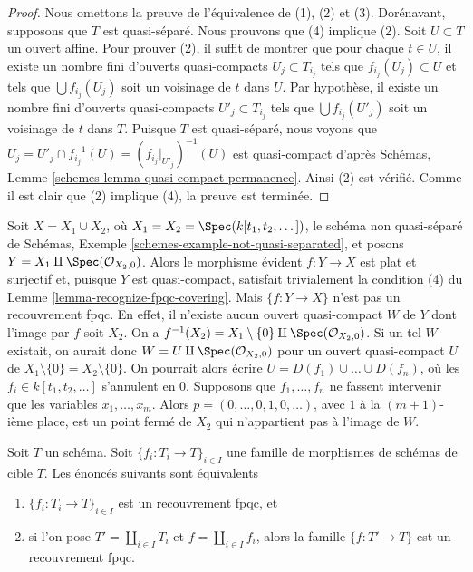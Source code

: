 \begin{proof}
Nous omettons la preuve de l'équivalence de (1), (2) et (3). Dorénavant, supposons que $T$ est quasi-séparé. Nous prouvons que (4) implique (2). Soit $U \subset T$ un ouvert affine. Pour prouver (2), il suffit de montrer que pour chaque $t \in U$, il existe un nombre fini d'ouverts quasi-compacts $U_j \subset T_{i_j}$ tels que $f_{i_j}(U_j) \subset U$ et tels que $\bigcup f_{i_j}(U_j)$ soit un voisinage de $t$ dans $U$. Par hypothèse, il existe un nombre fini d'ouverts quasi-compacts $U'_j \subset T_{i_j}$ tels que $\bigcup f_{i_j}(U'_j)$ soit un voisinage de $t$ dans $T$. Puisque $T$ est quasi-séparé, nous voyons que $U_j = U'_j \cap f_{i_j}^{-1}(U) = (f_{i_j}|_{U'_j})^{-1}(U)$ est quasi-compact d'après Schémas, Lemme \ref{schemes-lemma-quasi-compact-permanence}. Ainsi (2) est vérifié. Comme il est clair que (2) implique (4), la preuve est terminée.
\end{proof}


\begin{example}
\label{example-not-fpqc}
Soit $X = X_1 \cup X_2$, où $X_1 = X_2 = \Spec(k[t_1,t_2,\dots])$, le schéma non quasi-séparé de Schémas, Exemple \ref{schemes-example-not-quasi-separated}, et posons $Y = X_1 \amalg \Spec(\mathcal{O}_{X_2, 0})$. Alors le morphisme évident $f : Y \to X$ est plat et surjectif et, puisque $Y$ est quasi-compact, satisfait trivialement la condition (4) du Lemme \ref{lemma-recognize-fpqc-covering}. Mais $\{f : Y \to X\}$ n'est pas un recouvrement fpqc. En effet, il n'existe aucun ouvert quasi-compact $W$ de $Y$ dont l'image par $f$ soit $X_2$. On a $f^{-1}(X_2) = X_1 \setminus \{0\} \amalg \Spec(\mathcal{O}_{X_2, 0})$. Si un tel $W$ existait, on aurait donc $W = U \amalg \Spec(\mathcal{O}_{X_2, 0})$ pour un ouvert quasi-compact $U$ de $X_1 \setminus \{0\} = X_2 \setminus \{0\}$. On pourrait alors écrire $U = D(f_1) \cup \ldots \cup D(f_n)$, où les $f_i \in k[t_1, t_2, \ldots]$ s'annulent en $0$. Supposons que $f_1, \ldots, f_n$ ne fassent intervenir que les variables $x_1, \ldots, x_m$. Alors $p = (0, \ldots, 0, 1, 0, \ldots)$, avec $1$ à la $(m + 1)$-ième place, est un point fermé de $X_2$ qui n'appartient pas à l'image de $W$.
\end{example}

\begin{lemma}
\label{lemma-disjoint-union-is-fpqc-covering}
Soit $T$ un schéma. Soit $\{f_i : T_i \to T\}_{i \in I}$ une famille de morphismes de schémas de cible $T$. Les énoncés suivants sont équivalents
\begin{enumerate}
\item $\{f_i : T_i \to T\}_{i \in I}$ est un recouvrement fpqc, et
\item si l'on pose $T' = \coprod_{i \in I} T_i$ et $f = \coprod_{i \in I} f_i$, alors la famille $\{f : T' \to T\}$ est un recouvrement fpqc.
\end{enumerate}
\end{lemma}

